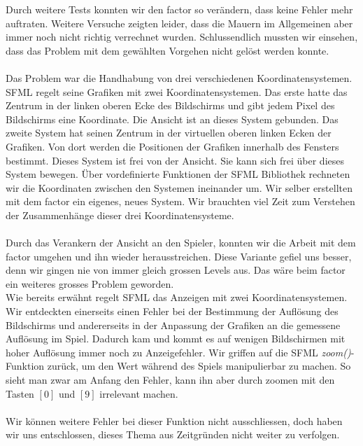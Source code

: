 \documentclass[11pt,a4paper]{scrbook}
\newcommand{\key}[1]{$[#1]$}
\begin{document}
Durch weitere Tests konnten wir den factor so verändern, dass keine Fehler mehr auftraten. 
Weitere Versuche zeigten leider, dass die Mauern im Allgemeinen aber immer noch nicht richtig verrechnet wurden.
Schlussendlich mussten wir einsehen, dass das Problem mit dem gewählten Vorgehen nicht gelöst werden konnte.
\\
\\
Das Problem war die Handhabung von drei verschiedenen Koordinatensystemen.
SFML regelt seine Grafiken mit zwei Koordinatensystemen.
Das erste hatte das Zentrum in der linken oberen Ecke des Bildschirms und gibt jedem Pixel des Bildschirms eine Koordinate.
Die Ansicht ist an dieses System gebunden.
Das zweite System hat seinen Zentrum in der virtuellen oberen linken Ecken der Grafiken.
Von dort werden die Positionen der Grafiken innerhalb des Fensters bestimmt.
Dieses System ist frei von der Ansicht. Sie kann sich frei über dieses System bewegen.
Über vordefinierte Funktionen der SFML Bibliothek rechneten wir die Koordinaten zwischen den Systemen ineinander um.
Wir selber erstellten mit dem factor ein eigenes, neues System.
Wir brauchten viel Zeit zum Verstehen der Zusammenhänge dieser drei Koordinatensysteme.\\
\\
Durch das Verankern der Ansicht an den Spieler, konnten wir die Arbeit mit dem factor umgehen und ihn wieder herausstreichen.
Diese Variante gefiel uns besser, denn wir gingen nie von immer gleich grossen Levels aus. 
Das wäre beim factor ein weiteres grosses Problem geworden.
\\
Wie bereits erwähnt regelt SFML das Anzeigen mit zwei Koordinatensystemen. Wir entdeckten einerseits einen Fehler bei der Bestimmung der Auflösung des Bildschirms und andererseits in der Anpassung der Grafiken an die gemessene Auflösung im Spiel.
Dadurch kam und kommt es auf wenigen Bildschirmen mit hoher Auflösung immer noch zu Anzeigefehler. Wir griffen auf die SFML \textit{zoom()}-Funktion zurück, um den Wert während des Spiels manipulierbar zu machen. So sieht man zwar am Anfang den Fehler, kann ihn aber durch zoomen mit den Tasten \key{0} und \key{9} irrelevant machen.\\
\\
Wir können weitere Fehler bei dieser Funktion nicht ausschliessen, doch haben wir uns entschlossen, dieses Thema aus Zeitgründen nicht weiter zu verfolgen. 
\end{document}
